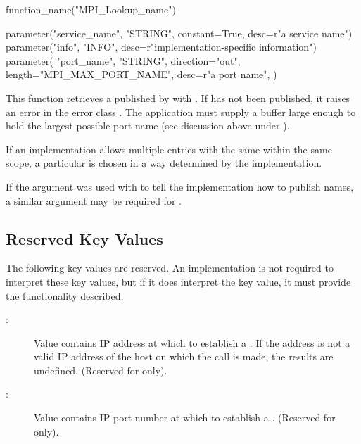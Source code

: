 %
\begin{mpi-binding}
    function_name("MPI_Lookup_name")

    parameter("service_name", "STRING", constant=True, desc=r"a service name")
    parameter("info", "INFO", desc=r"implementation-specific information")
    parameter(
        "port_name",
        "STRING",
        direction="out",
        length="MPI_MAX_PORT_NAME",
        desc=r"a port name",
    )
\end{mpi-binding}

This function retrieves a  published
by  with .
If  has not been published, it raises
an error in the error class . The application
must supply a  buffer large enough
to hold the largest possible port name (see discussion above under
).



If an implementation allows multiple entries with
the same  within the same scope,
a particular  is chosen in a way
determined by the implementation.

If the  argument was used with
 to tell the implementation
how to publish names, a similar  argument
may be required for .




\subsection{Reserved Key Values}
\label{subsec:cskeys}

The following key values are reserved. An implementation is not required to
interpret these key values, but if it does interpret the key value, it
must provide the functionality described.

\begin{description}

\item[:] Value contains IP address at which to
establish a . If the address is not a valid IP address of
the host on which the  call is made,
the results are undefined. (Reserved for 
only).
\item[:] Value contains IP port number at which to
establish a . (Reserved for 
only).
\end{description}



